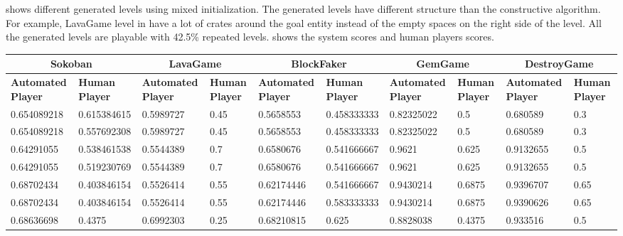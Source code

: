 shows different generated levels using mixed initialization. The generated levels have different structure than the constructive algorithm. For example, LavaGame level in  have a lot of crates around the goal entity instead of the empty spaces on the right side of the level. All the generated levels are playable with 42.5\% repeated levels.  shows the system scores and human players scores.


\begin{landscape}
\begin{table}[!ht]
	\centering
	\begin{tabular}{|p{0.8in}|p{0.8in}|p{0.8in}|p{0.8in}|p{0.8in}|p{0.8in}|p{0.8in}|p{0.8in}|p{0.8in}|p{0.8in}|}
		\hline
		\multicolumn{2}{c}{\textbf{Sokoban}} & \multicolumn{2}{c}{\textbf{LavaGame}} & \multicolumn{2}{c}{\textbf{\textbf{BlockFaker}}} & \multicolumn{2}{c}{\textbf{GemGame}} & \multicolumn{2}{c}{\textbf{DestroyGame}}\\
		\hline
		\textbf{Automated Player} & \textbf{Human Player} & \textbf{Automated Player} & \textbf{Human Player} & \textbf{Automated Player} & \textbf{Human Player} & \textbf{Automated Player} & \textbf{Human Player} & \textbf{Automated Player} & \textbf{Human Player}\\
		\hline
		0.654089218 & 0.615384615 & 0.5989727 & 0.45 & 0.5658553 & 0.458333333 & 0.82325022 & 0.5 & 0.680589 & 0.3\\
		\hline
		0.654089218 & 0.557692308 & 0.5989727 & 0.45 & 0.5658553 & 0.458333333 & 0.82325022 & 0.5 & 0.680589 & 0.3\\
		\hline
		0.64291055 & 0.538461538 & 0.5544389 & 0.7 & 0.6580676 & 0.541666667 & 0.9621 & 0.625 & 0.9132655 & 0.5\\
		\hline
		0.64291055 & 0.519230769 & 0.5544389 & 0.7 & 0.6580676 & 0.541666667 & 0.9621 & 0.625 & 0.9132655 & 0.5\\
		\hline
		0.68702434 & 0.403846154 & 0.5526414 & 0.55 & 0.62174446 & 0.541666667 & 0.9430214 & 0.6875 & 0.9396707 & 0.65\\
		\hline
		0.68702434 & 0.403846154 & 0.5526414 & 0.55 & 0.62174446 & 0.583333333 & 0.9430214 & 0.6875 & 0.9390626 & 0.65\\
		\hline
		0.68636698 & 0.4375 & 0.6992303 & 0.25 & 0.68210815 & 0.625 & 0.8828038 & 0.4375 & 0.933516 & 0.5\\

\end{tabular}
\end{table}
\end{landscape}
